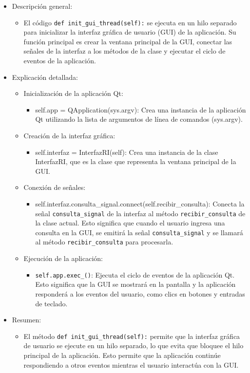 \begin{itemize}
  \item Descripción general:
  \begin{itemize}
    \item El código \texttt{def init\_gui\_thread(self):} se ejecuta en un hilo separado para inicializar la interfaz gráfica de usuario (GUI) de la aplicación. Su función principal es crear la ventana principal de la GUI, conectar las señales de la interfaz a los métodos de la clase y ejecutar el ciclo de eventos de la aplicación.
  \end{itemize}
  \item Explicación detallada:
  \begin{itemize}
    \item Inicialización de la aplicación Qt:
    \begin{itemize}
      \item self.app = QApplication(sys.argv): Crea una instancia de la aplicación Qt utilizando la lista de argumentos de línea de comandos (sys.argv).
    \end{itemize}
    \item Creación de la interfaz gráfica:
    \begin{itemize}
      \item self.interfaz = InterfazRI(self): Crea una instancia de la clase InterfazRI, que es la clase que representa la ventana principal de la GUI.
    \end{itemize}
    \item Conexión de señales:
    \begin{itemize}
      \item self.interfaz.consulta\_signal.connect(self.recibir\_consulta): Conecta la señal \texttt{consulta\_signal} de la interfaz al método \texttt{recibir\_consulta} de la clase actual. Esto significa que cuando el usuario ingresa una consulta en la GUI, se emitirá la señal \texttt{consulta\_signal} y se llamará al método \texttt{recibir\_consulta} para procesarla.
    \end{itemize}
    \item Ejecución de la aplicación:
    \begin{itemize}
      \item \texttt{self.app.exec\_()}: Ejecuta el ciclo de eventos de la aplicación Qt. Esto significa que la GUI se mostrará en la pantalla y la aplicación responderá a los eventos del usuario, como clics en botones y entradas de teclado.
    \end{itemize}
  \end{itemize}
  \item Resumen:
  \begin{itemize}
    \item El método \texttt{def init\_gui\_thread(self):} permite que la interfaz gráfica de usuario se ejecute en un hilo separado, lo que evita que bloquee el hilo principal de la aplicación. Esto permite que la aplicación continúe respondiendo a otros eventos mientras el usuario interactúa con la GUI.
  \end{itemize}
\end{itemize}
